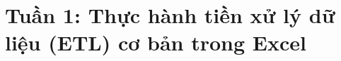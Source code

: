 \documentclass{article}
\begin{document}
\listoffigures
\newpage
\section{Tuần 1: Thực hành tiền xử lý dữ liệu (ETL) cơ bản trong Excel}







\end{document}
